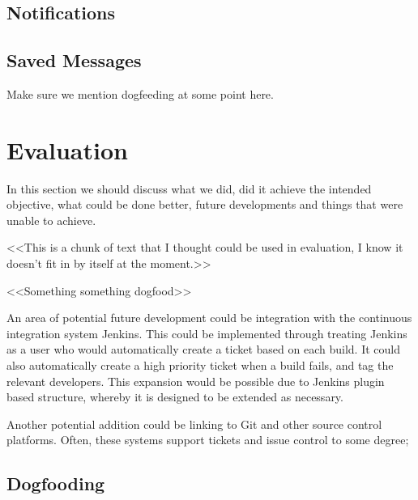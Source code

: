 \documentclass[a4paper]{l3proj}
\begin{document}
\section{Notifications}
\label{notifications}


\section{Saved Messages}
\label{savedMessages}

Make sure we mention dogfeeding at some point here.

\chapter{Evaluation}
\label{evaluation}

In this section we should discuss what we did, did it achieve the intended objective, what could be done better, 
future developments and things that were unable to achieve.

<<This is a chunk of text that I thought could be used in evaluation, I know it doesn't fit in by itself at the moment.>>

<<Something something dogfood>>

An area of potential future development could be integration with the continuous integration system Jenkins.  This could be implemented through treating Jenkins as a user who would automatically create a ticket based on each build.  It could also automatically create a high priority ticket when a build fails, and tag the relevant developers.  This expansion would be possible due to Jenkins plugin based structure, whereby it is designed to be extended as necessary.

Another potential addition could be linking to Git and other source control platforms. Often, these systems support tickets and issue control to some degree; 

\section{Dogfooding}
\label{dogfooding}


\end{document}
